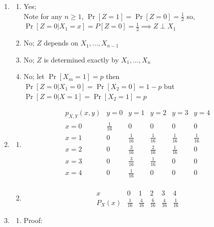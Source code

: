 \documentclass[12pt, a4paper]{article}
\begin{document}
\begin{enumerate}[Q\arabic*.]
  \item 
    \begin{enumerate}
      \item Yes;\\Note for any $n\geq 1$, $\Pr[Z=1] = \Pr[Z=0] = \frac{1}{2}$ so, $\Pr[Z=0|X_1=x] = P[Z=0] = \frac{1}{2} \implies Z \perp X_1$

      \item No; $Z$ depends on $X_1,\dots,X_{n-1}$

      \item No; $Z$ is determined exactly by $X_1,\dots,X_n$

      \item No; let $\Pr[X_m = 1] = p$ then $\Pr[Z=0|X_1=0] = \Pr[X_2=0] = 1-p$ but $\Pr[Z=0|X=1] = \Pr[X_2=1] = p$
    \end{enumerate}

  \item 
    \begin{enumerate}
      \item 
        \[
          \begin{array}{c|ccccc}
          p_{X,Y}(x,y) & y=0 & y=1 & y=2 & y=3 & y=4\\
          \hline
          x=0 & \frac{1}{16} & 0 & 0 & 0 & 0\\
          x=1 & 0 & \frac{1}{16} & \frac{1}{16} & \frac{1}{16} & \frac{1}{16}\\
          x=2 & 0 & \frac{3}{16} & \frac{2}{16} & \frac{1}{16} & 0\\
          x=3 & 0 & \frac{3}{16} & \frac{1}{16} & 0 & 0\\
          x=4 & 0 & \frac{1}{16} & 0 & 0 & 0\\
          \end{array}
          \]

      \item 
        \[
          \begin{array}{c|ccccc}
          x & 0 & 1 & 2 & 3 & 4\\
          \hline
          P_X(x) & \frac{1}{16} & \frac{4}{16} & \frac{6}{16} & \frac{4}{16} & \frac{1}{16}
          \end{array}
          \]
    \end{enumerate}

  \pagebreak
  \item 
    \begin{enumerate}
      \item Proof:


\end{enumerate}
\end{enumerate}
\end{document}
